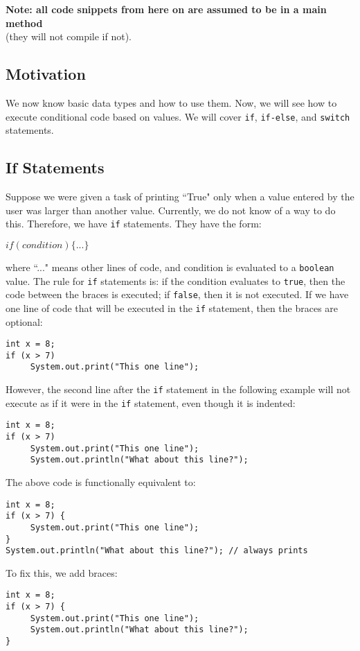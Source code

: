 
\begin{center}
\textbf{Note: all code snippets from here on are assumed to be in a main method} \\ (they will not compile if not).
\end{center}

\subsection{Motivation}
We now know basic data types and how to use them. Now, we will see how to execute conditional code based on values. We will cover \verb|if|, \verb|if-else|, and \verb|switch| statements.

\subsection{If Statements}
Suppose we were given a task of printing ``True" only when a value entered by the user was larger than another value. Currently, we do not know of a way to do this. Therefore, we have \verb|if| statements. They have the form:
\begin{center}
$if(condition) \{ ... \}$
\end{center}
where ``..." means other lines of code, and condition is evaluated to a \verb|boolean| value. The rule for \verb|if| statements is: if the condition evaluates to \verb|true|, then the code between the braces is executed; if \verb|false|, then it is not executed. If we have one line of code that will be executed in the \verb|if| statement, then the braces are optional:
\begin{lstlisting}
int x = 8;
if (x > 7)
     System.out.print("This one line");
\end{lstlisting}
However, the second line after the \verb|if| statement in the following example will not execute as if it were in the \verb|if| statement, even though it is indented:
\begin{lstlisting}
int x = 8;
if (x > 7)
     System.out.print("This one line");
     System.out.println("What about this line?");
\end{lstlisting}
The above code is functionally equivalent to:
\begin{lstlisting}
int x = 8;
if (x > 7) {
     System.out.print("This one line");
}
System.out.println("What about this line?"); // always prints
\end{lstlisting}
To fix this, we add braces:
\begin{lstlisting}
int x = 8;
if (x > 7) {
     System.out.print("This one line");
     System.out.println("What about this line?");
}
\end{lstlisting}
